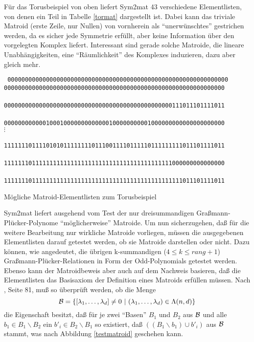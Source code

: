 Für das Torusbeispiel von oben liefert {\sc Sym2mat} 43 verschiedene
Elementlisten, von denen ein Teil in Tabelle \ref{tormat} dargestellt ist.
Dabei kann das triviale Matroid (erste Zeile, nur Nullen) von vornherein als
"`unerwünschtes"' gestrichen werden, da es sicher jede Symmetrie erfüllt,
aber keine Information über den vorgelegten Komplex liefert. Interessant sind
gerade solche Matroide, die lineare Unabhängigkeiten, eine "`Räumlichkeit"'
des Komplexes induzieren, dazu aber gleich mehr.

\begin{table}[htb]
\begin{center}
{\scriptsize\tt
{}
000000000000000000000000000000000000000000000000000000000000000\\
000000000000000000000000000000000000000000000000000000000000000\\
\\
000000000000000000000000000000000000000000000000111011101111011\\
\\
000000000000100010000000000000100000000001000000000000000000000\\
\hline
$\vdots$\\
\\
111111101111010101111111101110011110111110111111111011101111011\\
\\
111111101111111111111111111111111111111111111111000000000000000\\
\\
111111101111111111111111111111111111111111111111111011101111011
\etab
}
\end{center}
\caption{Mögliche Matroid-Elementlisten zum Torusbeispiel}
\label{tormat}
\end{table}

{\sc Sym2mat} liefert ausgehend vom Test der nur dreisummandigen
Graßmann-Plücker-Polynome "`möglicherweise"' Matroide. Um nun sicherzugehen,
daß für die weitere Bearbeitung nur wirkliche Matroide vorliegen, müssen die
ausgegebenen Elementlisten darauf getestet werden, ob sie Matroide darstellen
oder nicht. Dazu können, wie angedeutet, die übrigen k-summandigen
($4\leq k\leq rang+1$) Graßmann-Plücker-Relationen in Form der
Odd-Polynomials getestet werden. Ebenso kann der Matroidbeweis aber auch auf
dem Nachweis basieren, daß die Elementlisten das Basisaxiom der Definition
eines Matroids erfüllen müssen. Nach \cite{Bj:93}, Seite 81, muß
so überprüft werden, ob die Menge
$${\cal B}=\{[\lambda_1,\ldots,\lambda_d]\neq 0~|~(\lambda_1,\ldots,\lambda_d)
\in\Lambda (n,d)\}$$
die Eigenschaft besitzt, daß für je zwei "`Basen"' $B_1$ und $B_2$ aus
$\cal B$ und alle $b_1\in B_1\backslash B_2$ ein $b'_i\in B_2\backslash B_1$
so existiert, daß $((B_1\backslash b_1)\cup b'_i)$ aus $\cal B$ stammt, was
nach Abbildung \ref{testmatroid} geschehen kann.

